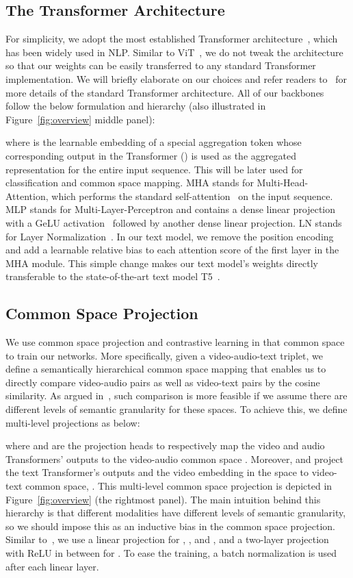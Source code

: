 \documentclass[10pt,twocolumn,letterpaper]{article}
\begin{document}
\subsection{The Transformer Architecture}
\label{tx-arch}
For simplicity, we adopt the most established Transformer architecture~\cite{devlin2018bert}, which has been widely used in NLP. Similar to ViT~\cite{dosovitskiy2021an}, we do not tweak the architecture so that our weights can be easily transferred to any standard Transformer implementation. We will briefly elaborate on our choices and refer readers to~\cite{dosovitskiy2021an,devlin2018bert} for more details of the standard Transformer architecture. All of our backbones follow the below formulation and hierarchy (also illustrated in Figure~\ref{fig:overview} middle panel):

where  is the learnable embedding of a special aggregation token whose corresponding output in the Transformer () is used as the aggregated representation for the entire input sequence. This will be later used for classification and common space mapping. MHA stands for Multi-Head-Attention, which performs the standard self-attention~\cite{vaswani2017attention} on the input sequence. MLP stands for Multi-Layer-Perceptron and contains a dense linear projection with a GeLU activation~\cite{hendrycks2016gaussian} followed by another dense linear projection. LN stands for Layer Normalization~\cite{ba2016layer}. In our text model, we remove the position encoding  and add a learnable relative bias to each attention score of the first layer in the MHA module. This simple change makes our text model's weights directly transferable to the state-of-the-art text model T5~\cite{raffel2020exploring}.

\subsection{Common Space Projection}
We use common space projection and contrastive learning in that common space to train our networks. More specifically, given a video-audio-text triplet, we define a semantically hierarchical common space mapping that enables us to directly compare video-audio pairs as well as video-text pairs by the cosine similarity. As argued in~\cite{mmv}, such comparison is more feasible if we assume there are different levels of semantic granularity for these spaces. To achieve this, we define multi-level projections as below:

where  and  are the projection heads to respectively map the video and audio Transformers' outputs to the video-audio common space . Moreover,  and  project the text Transformer's outputs and the video embedding in the  space to video-text common space, . This multi-level common space projection is depicted in Figure~\ref{fig:overview} (the rightmost panel). The main intuition behind this hierarchy is that different modalities have different levels of semantic granularity, so we should impose this as an inductive bias in the common space projection. Similar to~\cite{mmv}, we use a linear projection for , , and , and a two-layer projection with ReLU in between for . To ease the training, a batch normalization is used after each linear layer.
\end{document}
